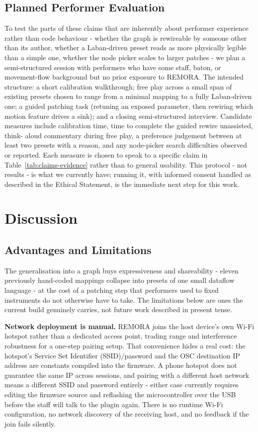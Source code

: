 \documentclass[sigconf,nonacm]{acmart}
\begin{document}
\subsection{Planned Performer Evaluation}
To test the parts of these claims that are inherently about performer experience rather than code
behaviour - whether the graph is rewireable by someone other than its author, whether a
Laban-driven preset reads as more physically legible than a simple one, whether the node picker
scales to larger patches - we plan a semi-structured session with performers who have some staff,
baton, or movement-flow background but no prior exposure to REMORA. The intended structure: a short
calibration walkthrough; free play across a small span of existing presets chosen to range from a
minimal mapping to a fully Laban-driven one; a guided patching task (retuning an exposed parameter,
then rewiring which motion feature drives a sink); and a closing semi-structured interview.
Candidate measures include calibration time, time to complete the guided rewire unassisted, think-
aloud commentary during free play, a preference judgement between at least two presets with a
reason, and any node-picker search difficulties observed or reported. Each measure is chosen to
speak to a specific claim in Table~\ref{tab:claims-evidence} rather than to general usability. This protocol - not results -
is what we currently have; running it, with informed consent handled as described in the Ethical
Statement, is the immediate next step for this work.

\section{Discussion}

\subsection{Advantages and Limitations}
\label{sec:limitations}
The generalisation into a graph buys expressiveness and shareability - eleven previously hand-coded
mappings collapse into presets of one small dataflow language - at the cost of a patching step that
performers used to fixed instruments do not otherwise have to take. The limitations below are ones
the current build genuinely carries, not future work described in present tense.

\textbf{Network deployment is manual.} REMORA joins the host device's own Wi-Fi hotspot rather than
a dedicated access point, trading range and interference robustness for a one-step pairing setup.
That convenience hides a real cost: the hotspot's Service Set Identifier (SSID)/password and the OSC
destination IP address are constants compiled into the firmware. A phone hotspot
does not guarantee the same IP across sessions, and pairing with a different host network means a
different SSID and password entirely -
either case currently requires editing the firmware source and reflashing the microcontroller over
the USB before the staff will talk to the plugin again. There is no runtime
Wi-Fi configuration, no
network discovery of the receiving host, and no feedback if the join fails silently.
\end{document}
